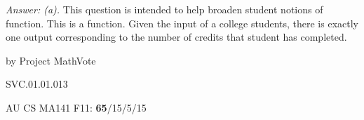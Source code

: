 {\it Answer: (a).}   This question is intended to help broaden student notions of function.  This is a function.  Given the input of a college students, there is exactly one output corresponding to the number of credits that student has completed. 

\medskip
by Project MathVote

SVC.01.01.013

AU CS MA141 F11: {\bf65}/15/5/15  \\
